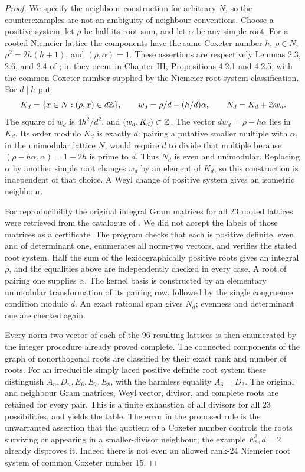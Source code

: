 \begin{proof}
We specify the neighbour construction for arbitrary \(N\), so the
counterexamples are not an ambiguity of neighbour conventions. Choose
a positive system, let \(\rho\) be half its root sum, and let \(\alpha\)
be any simple root. For a rooted Niemeier lattice the components have
the same Coxeter number \(h\), \(\rho\in N\),
\(\rho^2=2h(h+1)\), and \((\rho,\alpha)=1\). These assertions are
respectively Lemmas 2.3, 2.6, and 2.4 of \citet{B_Borcherds1985};
in \citet{B_ChenevierLannes2019} they occur in Chapter III,
Propositions 4.2.1 and 4.2.5, with the common Coxeter number supplied
by the Niemeier root-system classification.
For \(d\mid h\) put
\[
 K_d=\{x\in N:(\rho,x)\in d\mathbb Z\},\qquad
 w_d=\rho/d-(h/d)\alpha,\qquad N_d=K_d+\mathbb Z w_d.
\]
The square of \(w_d\) is \(4h^2/d^2\), and \((w_d,K_d)\subset\mathbb Z\).
The vector \(dw_d=\rho-h\alpha\) lies in \(K_d\). Its order modulo
\(K_d\) is exactly \(d\): pairing a putative smaller multiple with
\(\alpha\), in the unimodular lattice \(N\), would require \(d\)
to divide that multiple because
\((\rho-h\alpha,\alpha)=1-2h\) is prime to \(d\).
Thus \(N_d\) is even and unimodular. Replacing \(\alpha\) by another
simple root changes \(w_d\) by an element of \(K_d\), so this
construction is independent of that choice. A Weyl change of positive
system gives an isometric neighbour.

For reproducibility the original integral Gram matrices for all 23
rooted lattices were retrieved from the catalogue of
\citet{B_NebeSloaneCatalogue}. We did not accept the labels of those
matrices as a certificate. The program 
checks that each is positive definite, even and of determinant one,
enumerates all norm-two vectors, and verifies the stated root system.
Half the sum of the lexicographically positive roots gives an integral
\(\rho\), and the equalities above are independently checked in every
case. A root of pairing one supplies \(\alpha\). The kernel basis is
constructed by an elementary unimodular transformation of its pairing
row, followed by the single congruence condition modulo \(d\). An
exact rational span gives \(N_d\); evenness and determinant one are
checked again.

Every norm-two vector of each of the 96 resulting lattices is then
enumerated by the integer procedure already proved complete. The
connected components of the graph of nonorthogonal roots are
classified by their exact rank and number of roots. For an irreducible
simply laced positive definite root system these distinguish
\(A_n,D_n,E_6,E_7,E_8\), with the harmless equality \(A_3=D_3\).
The original and neighbour Gram matrices, Weyl vector, divisor,
and complete roots are retained for every pair. This is a finite
exhaustion of all divisors for all 23 possibilities, and yields the
table. The error in the proposed rule is the unwarranted assertion
that the quotient of a Coxeter number controls the roots surviving
or appearing in a smaller-divisor neighbour; the example
\(E_8^3,d=2\) already disproves it. Indeed there is not even an
allowed rank-24 Niemeier root system of common Coxeter number 15.


\end{proof}
